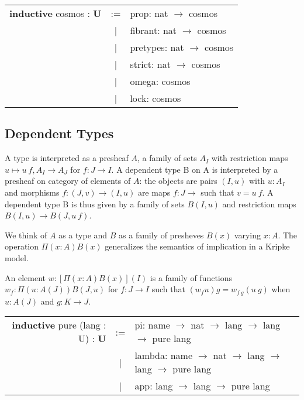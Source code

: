 \documentclass[a4paper,UKenglish,cleveref, autoref, thm-restate]{lipics-v2021}
\begin{document}
\begin{table}[ht]
\begin{tabular}{rcl}
  \textbf{inductive} cosmos : \textbf{U}& := & prop: nat $\rightarrow$ cosmos \\
   &|& fibrant: nat $\rightarrow$ cosmos \\
   &|& pretypes: nat $\rightarrow$ cosmos \\
   &|& strict: nat $\rightarrow$ cosmos \\
   &|& omega: cosmos \\
   &|& lock: cosmos \\
\end{tabular}
\end{table}

\newpage

\subsection{Dependent Types}

\begin{definition}[Type]
A type is interpreted as a presheaf $A$, a family of sets $A_I$ with restriction maps
$u \mapsto u\ f, A_I \rightarrow A_J$ for $f: J\rightarrow I$. A dependent type
B on A is interpreted by a presheaf on category of elements of $A$: the objects
are pairs $(I,u)$ with $u : A_I$ and morphisms $f: (J,v) \rightarrow (I,u)$ are
maps $f : J \rightarrow$ such that $v = u\ f$. A dependent type B is thus given
by a family of sets $B(I,u)$ and restriction maps $B(I,u) \rightarrow B(J,u\ f)$.
\end{definition}


We think of $A$ as a type and $B$ as a family of presheves $B(x)$ varying $x:A$.
The operation $\Pi(x:A)B(x)$ generalizes the semantics of
implication in a Kripke model.

\begin{definition}[Pi]
An element $w:[\Pi(x:A)B(x)](I)$ is a family of functions $w_f : \Pi(u:A(J))B(J,u)$
for $f : J \rightarrow I$ such that $(w_f u)g=w_{f\ g}(u\ g)$ when $u:A(J)$ and $g:K\rightarrow J$.
\end{definition}
\begin{table}[ht]
\begin{tabular}{rcl}
  \textbf{inductive} pure (lang : U) : \textbf{U}& := & pi: name $\rightarrow$ nat $\rightarrow$ lang $\rightarrow$ lang $\rightarrow$ pure lang \\
  &|& lambda: name $\rightarrow$ nat $\rightarrow$ lang $\rightarrow$ lang $\rightarrow$ pure lang \\
  &|& app: lang $\rightarrow$ lang $\rightarrow$ pure lang \\
\end{tabular}
\end{table}
\end{document}

